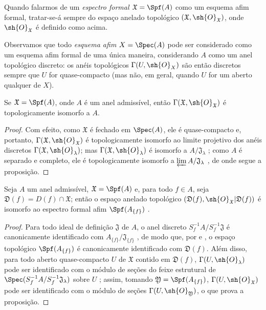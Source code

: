 \documentclass[oneside]{amsart}
\let\EGAOriginalLabel\label
\renewcommand{\label}[1]{\phantomsection\EGAOriginalLabel{#1}}
\begin{document}
Quando falarmos de um \emph{espectro formal $\mathfrak{X}=\Spf(A)$} como um esquema afim formal, tratar-se-á sempre do espaço anelado topológico $(\mathfrak{X},\sh{O}_\mathfrak{X})$, onde $\sh{O}_\mathfrak{X}$ é definido como acima.

Observamos que todo \emph{esquema afim} $X=\Spec(A)$ pode ser considerado como um esquema afim formal de uma única maneira, considerando $A$ como um anel topológico discreto: os anéis topológicos $\Gamma(U,\sh{O}_X)$ são então discretos sempre que $U$ for quase-compacto (mas não, em geral, quando $U$ for um aberto qualquer de $X$).

\begin{proposition}[10.1.3]
\label{I.10.1.3}
Se $\mathfrak{X}=\Spf(A)$, onde $A$ é um anel admissível, então $\Gamma(\mathfrak{X},\sh{O}_\mathfrak{X})$ é topologicamente isomorfo a $A$.
\end{proposition}

\begin{proof}
Com efeito, como $\mathfrak{X}$ é fechado em $\Spec(A)$, ele é quase-compacto e, portanto, $\Gamma(\mathfrak{X},\sh{O}_\mathfrak{X})$ é topologicamente isomorfo ao limite projetivo dos anéis discretos $\Gamma(\mathfrak{X},\sh{O}_\lambda)$; mas $\Gamma(\mathfrak{X},\sh{O}_\lambda)$ é isomorfo a $A/\mathfrak{J}_\lambda$ ; como $A$ é separado e completo, ele é topologicamente isomorfo a $\varprojlim A/\mathfrak{J}_\lambda$ , de onde segue a proposição.
\end{proof}

\begin{proposition}[10.1.4]
\label{I.10.1.4}
Seja $A$ um anel admissível, $\mathfrak{X}=\Spf(A)$ e, para todo $f\in A$, seja $\mathfrak{D}(f)=D(f)\cap\mathfrak{X}$; então o espaço anelado topológico $(\mathfrak{D}(f),\sh{O}_\mathfrak{X}|\mathfrak{D}(f))$ é isomorfo ao espectro formal afim $\Spf(A_{\{f\}})$ .
\end{proposition}

\begin{proof}
Para todo ideal de definição $\mathfrak{J}$ de $A$, o anel discreto $S_f^{-1}A/ S_f^{-1}\mathfrak{J}$ é canonicamente identificado com $A_{\{f\}}/\mathfrak{J}_{\{f\}}$ , de modo que, por  e , o espaço topológico $\Spf(A_{\{f\}})$ é canonicamente identificado com $\mathfrak{D}(f)$.
Além disso, para todo aberto quase-compacto $U$ de $\mathfrak{X}$ contido em $\mathfrak{D}(f)$, $\Gamma(U,\sh{O}_\lambda)$ pode ser identificado com o módulo de seções do feixe estrutural de $\Spec(S_f^{-1}A/ S_f^{-1}\mathfrak{J}_\lambda)$ sobre $U$ ; assim, tomando $\mathfrak{Y}=\Spf(A_{\{f\}})$, $\Gamma(U,\sh{O}_\mathfrak{X})$ pode ser identificado com o módulo de seções $\Gamma(U,\sh{O}_\mathfrak{Y})$, o que prova a proposição.
\end{proof}
\end{document}
